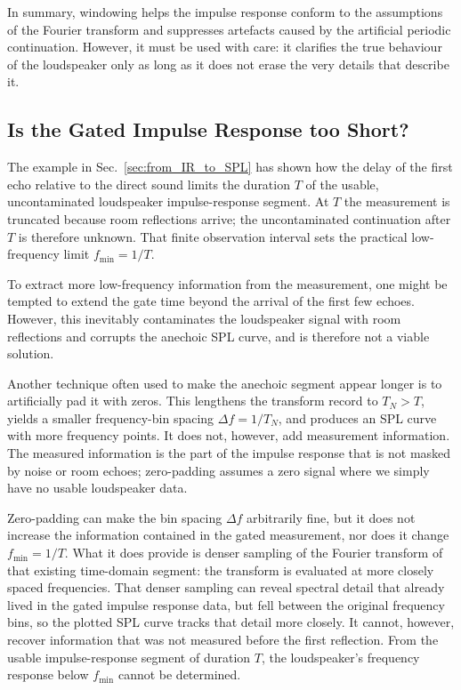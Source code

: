 \documentclass[12pt,a4paper]{article}
\providecommand{\seclabel}[1]{\label{sec:#1}}
\providecommand{\secn}[1]{Sec.~\ref{sec:#1}}
\begin{document}
In summary, windowing helps the impulse response conform to the assumptions of the Fourier transform and suppresses artefacts caused by the artificial periodic continuation. However, it must be used with care: it clarifies the true behaviour of the loudspeaker only as long as it does not erase the very details that describe it.


\subsection{Is the Gated Impulse Response too Short?}\seclabel{zeropadding}

The example in \secn{from_IR_to_SPL} has shown how the delay of the first echo relative to the direct sound limits the duration $T$ of the usable, uncontaminated loudspeaker impulse-response segment. At $T$ the measurement is truncated because room reflections arrive; the uncontaminated continuation after $T$ is therefore unknown. That finite observation interval sets the practical low-frequency limit $f_{\min} = 1/T$.

To extract more low-frequency information from the measurement, one might be tempted to extend the gate time beyond the arrival of the first few echoes. However, this inevitably contaminates the loudspeaker signal with room reflections and corrupts the anechoic SPL curve, and is therefore not a viable solution.

Another technique often used to make the anechoic segment appear longer is to artificially pad it with zeros. This lengthens the transform record to $T_N > T$, yields a smaller frequency-bin spacing $\Delta f = 1/T_N$, and produces an SPL curve with more frequency points. It does not, however, add measurement information. The measured information is the part of the impulse response that is not masked by noise or room echoes; zero-padding assumes a zero signal where we simply have no usable loudspeaker data.

Zero-padding can make the bin spacing $\Delta f$ arbitrarily fine, but it does not increase the information contained in the gated measurement, nor does it change $f_{\min} = 1/T$. What it does provide is denser sampling of the Fourier transform of that existing time-domain segment: the transform is evaluated at more closely spaced frequencies. That denser sampling can reveal spectral detail that already lived in the gated impulse response data, but fell between the original frequency bins, so the plotted SPL curve tracks that detail more closely. It cannot, however, recover information that was not measured before the first reflection. From the usable impulse-response segment of duration $T$, the loudspeaker's frequency response below $f_{\min}$ cannot be determined.
\end{document}
